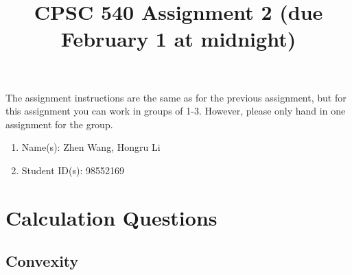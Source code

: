\documentclass{article}
\def\blu#1{{\color{blu}#1}}
\def\enum#1{\begin{enumerate}#1\end{enumerate}}
\begin{document}
\title{CPSC 540 Assignment 2 (due February 1 at midnight)}
\author{}
\date{}
\maketitle
\vspace{-4em}

The assignment instructions are the same as for the previous assignment, but for this assignment you can work in groups of 1-3. However, please only hand in one assignment for the group.


\blu{\enum{
\item Name(s): Zhen Wang, Hongru Li
\item Student ID(s): 98552169
}}




\section{Calculation Questions}


\subsection{Convexity}
\end{document}

